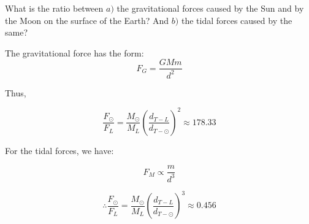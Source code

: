 \documentclass[11pt]{article}
\begin{document}
\begin{pproblem} What is the ratio between \(a)\) the gravitational forces caused by the Sun and by the Moon on the surface of the Earth? And \(b)\) the tidal forces caused by the same?
    \begin{pssolution*}{}{}
        \begin{alternativas}
            \item The gravitational force has the form:
            \[F_G = \frac{GMm}{d^2}\]

            Thus,

            \[\frac{F_\odot}{F_L} = \frac{M_\odot}{M_L}\left(\frac{d_{T-L}}{d_{T-\odot}}\right)^2 \boxed{\approx 178.33}\]

            \item For the tidal forces, we have:
            
            \[F_M \propto \frac{m}{d^3}\]

            \[\therefore \frac{F_\odot}{F_L} = \frac{M_\odot}{M_L}\left(\frac{d_{T-L}}{d_{T-\odot}}\right)^3 \boxed{\approx 0.456}\]

        \end{alternativas}
    \end{pssolution*}
\end{pproblem}
\end{document}

